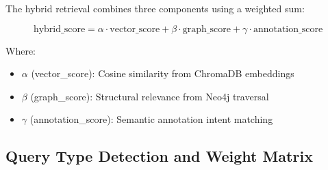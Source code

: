 \documentclass[11pt,letterpaper,twoside]{article}
\begin{document}
The hybrid retrieval combines three components using a weighted sum:

\begin{equation}
\text{hybrid\_score} = \alpha \cdot \text{vector\_score} + \beta \cdot \text{graph\_score} + \gamma \cdot \text{annotation\_score}
\end{equation}

Where:
\begin{itemize}[leftmargin=2em]
    \item $\alpha$ (vector\_score): Cosine similarity from ChromaDB embeddings
    \item $\beta$ (graph\_score): Structural relevance from Neo4j traversal
    \item $\gamma$ (annotation\_score): Semantic annotation intent matching
\end{itemize}

\subsection{Query Type Detection and Weight Matrix}
\end{document}
